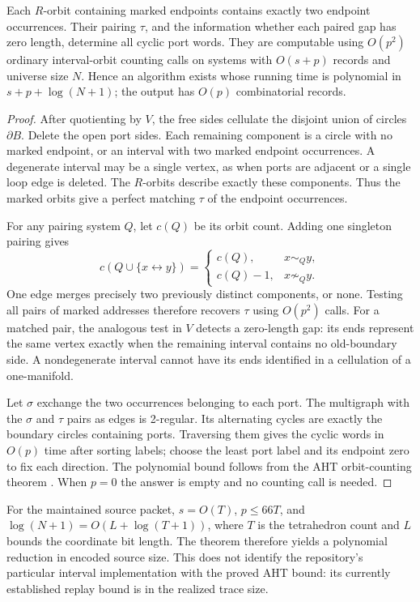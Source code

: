 \begin{theorem}
\label{thm:finite-interface}
Each $R$-orbit containing marked endpoints contains exactly two endpoint
occurrences.  Their pairing $\tau$, and the information whether each paired
gap has zero length, determine all cyclic port words.  They are computable
using $O(p^2)$ ordinary interval-orbit counting calls on systems with
$O(s+p)$ records and universe size $N$.  Hence an algorithm exists whose
running time is polynomial in $s+p+\log(N+1)$; the output has $O(p)$
combinatorial records.
\end{theorem}
\begin{proof}
After quotienting by $V$, the free sides cellulate the disjoint union of
circles $\partial B$.  Delete the open port sides.  Each remaining component
is a circle with no marked endpoint, or an interval with two marked endpoint
occurrences.  A degenerate interval may be a single vertex, as when ports
are adjacent or a single loop edge is deleted.  The $R$-orbits describe
exactly these components.  Thus the marked orbits give a perfect matching
$\tau$ of the endpoint occurrences.

For any pairing system $Q$, let $c(Q)$ be its orbit count.  Adding one
singleton pairing gives
\[
 c(Q\cup\{x\leftrightarrow y\})=
 \begin{cases}c(Q),&x\sim_Qy,\\c(Q)-1,&x\not\sim_Qy.\end{cases}
\]
One edge merges precisely two previously distinct components, or none.
Testing all pairs of marked addresses therefore recovers $\tau$ using
$O(p^2)$ calls.  For a matched pair, the analogous test in $V$ detects a
zero-length gap: its ends represent the same vertex exactly when the
remaining interval contains no old-boundary side.  A nondegenerate interval
cannot have its ends identified in a cellulation of a one-manifold.

Let $\sigma$ exchange the two occurrences belonging to each port.
The multigraph with the $\sigma$ and $\tau$ pairs as edges is 2-regular.
Its alternating cycles are exactly the boundary circles containing ports.
Traversing them gives the cyclic words in $O(p)$ time after sorting labels;
choose the least port label and its endpoint zero to fix each direction.
The polynomial bound follows from the AHT orbit-counting theorem
\cite{AHT2006}.  When $p=0$ the answer is empty and no counting call is needed.
\end{proof}

For the maintained source packet, $s=O(T)$, $p\leq66T$, and
$\log(N+1)=O(L+\log(T+1))$, where $T$ is the tetrahedron count and $L$
bounds the coordinate bit length.  The theorem therefore yields a
polynomial reduction in encoded source size.  This does not identify the
repository's particular interval implementation with the proved AHT bound:
its currently established replay bound is in the realized trace size.

